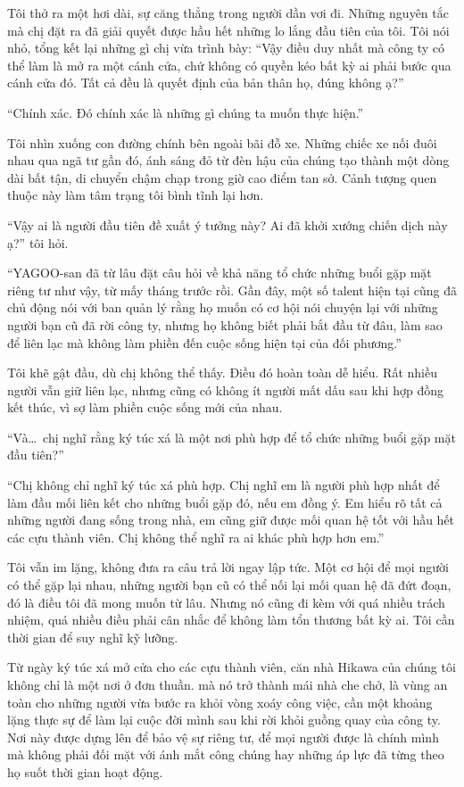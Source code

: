 \documentclass[../main.tex]{subfiles}
\begin{document}
Tôi thở ra một hơi dài, sự căng thẳng trong người dần vơi đi. Những nguyên tắc mà chị đặt ra đã giải quyết được hầu hết những lo lắng đầu tiên của tôi. Tôi nói nhỏ, tổng kết lại những gì chị vừa trình bày: ``Vậy điều duy nhất mà công ty có thể làm là mở ra một cánh cửa, chứ không có quyền kéo bất kỳ ai phải bước qua cánh cửa đó. Tất cả đều là quyết định của bản thân họ, đúng không ạ?''

``Chính xác. Đó chính xác là những gì chúng ta muốn thực hiện.''

Tôi nhìn xuống con đường chính bên ngoài bãi đỗ xe. Những chiếc xe nối đuôi nhau qua ngã tư gần đó, ánh sáng đỏ từ đèn hậu của chúng tạo thành một dòng dài bất tận, di chuyển chậm chạp trong giờ cao điểm tan sở. Cảnh tượng quen thuộc này làm tâm trạng tôi bình tĩnh lại hơn.

``Vậy ai là người đầu tiên đề xuất ý tưởng này? Ai đã khởi xướng chiến dịch này ạ?'' tôi hỏi.

``YAGOO-san đã từ lâu đặt câu hỏi về khả năng tổ chức những buổi gặp mặt riêng tư như vậy, từ mấy tháng trước rồi. Gần đây, một số talent hiện tại cũng đã chủ động nói với ban quản lý rằng họ muốn có cơ hội nói chuyện lại với những người bạn cũ đã rời công ty, nhưng họ không biết phải bắt đầu từ đâu, làm sao để liên lạc mà không làm phiền đến cuộc sống hiện tại của đối phương.''

Tôi khẽ gật đầu, dù chị không thể thấy. Điều đó hoàn toàn dễ hiểu. Rất nhiều người vẫn giữ liên lạc, nhưng cũng có không ít người mất dấu sau khi hợp đồng kết thúc, vì sợ làm phiền cuộc sống mới của nhau.

``Và\dots\ chị nghĩ rằng ký túc xá là một nơi phù hợp để tổ chức những buổi gặp mặt đầu tiên?''

``Chị không chỉ nghĩ ký túc xá phù hợp. Chị nghĩ em là người phù hợp nhất để làm đầu mối liên kết cho những buổi gặp đó, nếu em đồng ý. Em hiểu rõ tất cả những người đang sống trong nhà, em cũng giữ được mối quan hệ tốt với hầu hết các cựu thành viên. Chị không thể nghĩ ra ai khác phù hợp hơn em.''

Tôi vẫn im lặng, không đưa ra câu trả lời ngay lập tức. Một cơ hội để mọi người có thể gặp lại nhau, những người bạn cũ có thể nối lại mối quan hệ đã đứt đoạn, đó là điều tôi đã mong muốn từ lâu. Nhưng nó cũng đi kèm với quá nhiều trách nhiệm, quá nhiều điều phải cân nhắc để không làm tổn thương bất kỳ ai. Tôi cần thời gian để suy nghĩ kỹ lưỡng.

Từ ngày ký túc xá mở cửa cho các cựu thành viên, căn nhà Hikawa của chúng tôi không chỉ là một nơi ở đơn thuần. mà nó trở thành mái nhà che chở, là vùng an toàn cho những người vừa bước ra khỏi vòng xoáy công việc, cần một khoảng lặng thực sự để làm lại cuộc đời mình sau khi rời khỏi guồng quay của công ty. Nơi này được dựng lên để bảo vệ sự riêng tư, để mọi người được là chính mình mà không phải đối mặt với ánh mắt công chúng hay những áp lực đã từng theo họ suốt thời gian hoạt động.
\end{document}
